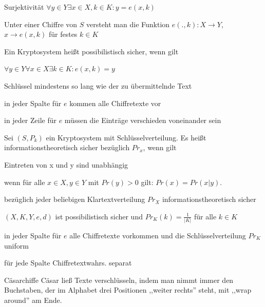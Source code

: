 \documentclass[avery5371, frame]{flashcards}
\begin{document}
\begin{flashcard}[Kryptosysteme]{Surjektivität}
    $\forall y\in Y\exists x\in X,k\in K:y=e(x,k)$
\end{flashcard}

\begin{flashcard}[Kryptosysteme]{Unter einer Chiffre von $S$ versteht man}
    die Funktion $e(.,k):X\rightarrow Y$, $x\rightarrow e(x,k)$ für festes $k\in K$
\end{flashcard}

\begin{flashcard}[Kryptosysteme]{Ein Kryptosystem heißt possibilistisch sicher, wenn gilt}
    \begin{itemize*}
        \item $\forall y\in Y\forall x\in X\exists k\in K:e(x,k)=y$
        \item Schlüssel mindestens so lang wie der zu übermittelnde Text
        \item in jeder Spalte für $e$ kommen alle Chiffretexte vor
        \item in jeder Zeile für $e$ müssen die Einträge verschieden voneinander sein
    \end{itemize*}
\end{flashcard}

\begin{flashcard}[Kryptosysteme]{Sei $(S,P_k)$ ein Kryptosystem mit Schlüsselverteilung. Es heißt informationstheoretisch sicher bezüglich $Pr_x$, wenn gilt}
    \begin{itemize*}
        \item Eintreten von x und y sind unabhängig
        \item wenn für alle $x\in X,y\in Y$ mit $Pr(y)>0$ gilt: $Pr(x) = Pr(x|y)$.
        \item bezüglich jeder beliebigen Klartextverteilung $Pr_X$ informationstheoretisch sicher
        \item $(X,K,Y,e,d)$ ist possibilistisch sicher und $Pr_K(k)=\frac{1}{|K|}$ für alle $k\in K$
        \item in jeder Spalte für $e$ alle Chiffretexte vorkommen und die Schlüsselverteilung $Pr_K$ uniform
        \item für jede Spalte Chiffretextwahrs. separat
    \end{itemize*}
\end{flashcard}

\begin{flashcard}[Definition]{Cäsarchiffe}
    Cäsar ließ Texte verschlüsseln, indem man nimmt immer den Buchstaben, der im Alphabet drei Positionen ,,weiter rechts'' steht, mit ,,wrap around'' am Ende.
\end{flashcard}
\end{document}
